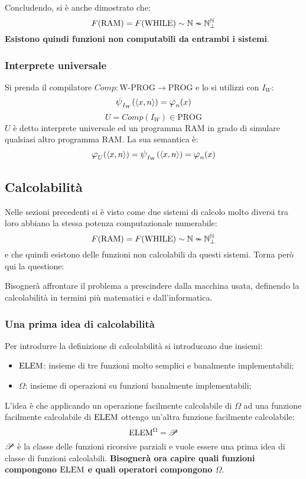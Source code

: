 Concludendo, si è anche dimostrato che:
$$ F(\text{RAM})=F(\text{WHILE}) \sim \mathbb{N} \nsim \mathbb{N}^{\mathbb{N}}_\perp $$
\textbf{Esistono quindi funzioni non computabili da entrambi i sistemi}.

\subsubsection{Interprete universale}
Si prenda il compilatore $Comp:\text{W-PROG}\to\text{PROG}$ e lo si utilizzi con $I_W$:
$$ \semanticaWHILE_{I_W}(\cantor{x,n})=\semanticaRAM_n(x) $$
$$ U = Comp(I_W)\in\text{PROG} $$
$U$ è detto interprete universale ed un programma RAM in grado di simulare qualsiasi
altro programma RAM.
La sua semantica è:
$$ \semanticaRAM_U(\cantor{x,n})=\semanticaWHILE_{I_W}(\cantor{x,n})=\semanticaRAM_n(x) $$

\subsection{Calcolabilità}
Nelle sezioni precedenti si è visto come due sistemi di calcolo molto diversi tra loro 
abbiano la stessa potenza computazionale numerabile:
$$ F(\text{RAM}) = F(\text{WHILE}) \sim \mathbb{N} \nsim \mathbb{N}^{\mathbb{N}}_\perp$$
e che quindi esistono delle funzioni non calcolabili da questi sistemi. Torna però qui la
questione: 

Bisognerà affrontare il problema a prescindere dalla macchina usata, definendo la 
calcolabilità in termini più matematici e  dall'informatica.

\subsubsection{Una prima idea di calcolabilità}
Per introdurre la definizione  di calcolabilità si introducano due insiemi:
\begin{itemize}
    \item $\text{ELEM}$: insieme di tre funzioni molto semplici e banalmente implementabili;
    \item $\Omega$: insieme di operazioni su funzioni banalmente implementabili;
\end{itemize}

L'idea è che applicando un operazione facilmente calcolabile di $\Omega$ ad una funzione
facilmente calcolabile di $\text{ELEM}$ ottengo un'altra funzione facilmente calcolabile:
$$ \text{ELEM}^\Omega = \mathscr{P} $$
$\mathscr{P}$ è la classe delle funzioni ricorsive parziali e vuole essere una prima 
idea di classe di funzioni calcolabili. \textbf{Bisognerà ora capire quali funzioni compongono 
$\text{ELEM}$ e quali operatori compongono $\Omega$}.

